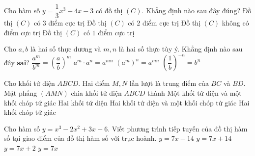 \begin{ex}%
Cho hàm số $y=\dfrac{1}{3}x^3+4x-3$ có đồ thị $(C)$. Khẳng định nào sau đây đúng?
\choice
{Đồ thị $(C)$ có $3$ điểm cực trị}
{Đồ thị $(C)$ có $2$ điểm cực trị}
{\True Đồ thị $(C)$ không có điểm cực trị}
{Đồ thị $(C)$ có $1$ điểm cực trị}
\end{ex}

\begin{ex}%
Cho $a, b$ là hai số thực dương và $m, n$ là hai số thực tùy ý. Khẳng định nào sau đây \textbf{sai}?
\choice
{$\dfrac{a^m}{b^m}=\left(\dfrac{a}{b}\right) ^m$}
{\True $a^m \cdot a^n=a^{mn}$}
{$\left( a^m\right)^n=a^{mn}$}
{$\left(\dfrac{1}{b}\right)^{-n}=b^n$}
\end{ex}

\begin{ex}%
Cho khối tứ diện $ABCD$. Hai điểm $M, N$ lần lượt là trung điểm của $BC$ và $BD$. Mặt phẳng $(AMN)$ chia khối tứ diện $ABCD$ thành
\choice
{\True Một khối tứ diện và một khối chóp tứ giác}
{Hai khối tứ diện}
{Hai khối tứ diện và một khối chóp tứ giác}
{Hai khối chóp tứ giác}
\end{ex}

\begin{ex}%
Cho hàm số $y=x^3-2x^2+3x-6$. Viết phương trình tiếp tuyến của đồ thị hàm số tại giao điểm của đồ thị hàm số với trục hoành.
\choice
{\True $y=7x-14$}
{$y=7x+14$}
{$y=7x+2$}
{$y=7x$}
\end{ex}

